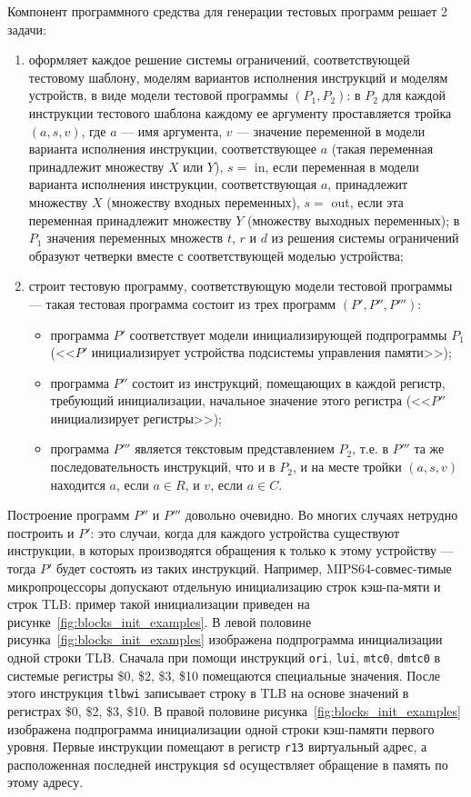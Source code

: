 Компонент программного средства для генерации тестовых программ  решает 2 задачи:
  \begin{enumerate}
    \item оформляет каждое решение системы ограничений, соответствующей тестовому шаблону, моделям вариантов исполнения инструкций и моделям устройств, в виде модели тестовой программы $(P_1, P_2)$: в $P_2$ для каждой инструкции тестового шаблона каждому ее аргументу проставляется тройка $(a, s, v)$, где $a$ --- имя аргумента, $v$ --- значение переменной в модели варианта исполнения инструкции, соответствующее $a$ (такая переменная принадлежит множеству $X$ или $Y$), $s =$ in, если переменная в модели варианта исполнения инструкции, соответствующая $a$, принадлежит множеству $X$ (множеству входных переменных), $s =$ out, если эта переменная принадлежит множеству $Y$ (множеству выходных переменных); в $P_1$ значения переменных множеств $t$, $r$ и $d$ из решения системы ограничений образуют четверки вместе с соответствующей моделью устройства;
    \item строит тестовую программу, соответствующую модели тестовой программы --- такая тестовая программа состоит из трех программ $(P', P'', P''')$:
            \begin{itemize}
              \item программа $P'$ соответствует модели инициализирующей подпрограммы $P_1$ (<<$P'$ инициализирует устройства подсистемы управления памяти>>);
               \item программа $P''$ состоит из инструкций, помещающих в каждой регистр, требующий инициализации, начальное значение этого регистра (<<$P''$ инициализирует регистры>>);
               \item программа $P'''$ является текстовым представлением $P_2$, т.е. в $P'''$ та же последовательность инструкций, что и в $P_2$, и на месте тройки $(a, s, v)$ находится $a$, если $a \in R$, и $v$, если $a \in C$.
            \end{itemize}
  \end{enumerate}

Построение программ $P''$ и $P'''$ довольно очевидно. Во многих случаях нетрудно построить и $P'$: это случаи, когда для каждого устройства существуют инструкции, в которых производятся обращения к только к этому устройству --- тогда $P'$ будет состоять из таких инструкций. Например, MIPS64-совмес-тимые микропроцессоры допускают отдельную инициализацию строк кэш-па-мяти и строк TLB: пример такой инициализации приведен на рисунке~\ref{fig:blocks_init_examples}. В левой половине рисунка~\ref{fig:blocks_init_examples} изображена подпрограмма инициализации одной строки TLB. Сначала при помощи инструкций \texttt{ori}, \texttt{lui}, \texttt{mtc0}, \texttt{dmtc0} в системые регистры \$0, \$2, \$3, \$10 помещаются специальные значения. После этого инструкция \texttt{tlbwi} записывает строку в TLB на основе значений в регистрах \$0, \$2, \$3, \$10. В правой половине рисунка~\ref{fig:blocks_init_examples} изображена подпрограмма инициализации одной строки кэш-памяти первого уровня. Первые инструкции помещают в регистр \texttt{r13} виртуальный адрес, а расположенная последней инструкция \texttt{sd} осуществляет обращение в память по этому адресу.

